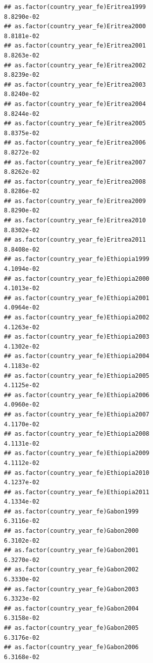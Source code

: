 \documentclass[
  a4paper,
]{article}
\begin{document}
\begin{verbatim}
## as.factor(country_year_fe)Eritrea1999                           8.8290e-02
## as.factor(country_year_fe)Eritrea2000                           8.8181e-02
## as.factor(country_year_fe)Eritrea2001                           8.8263e-02
## as.factor(country_year_fe)Eritrea2002                           8.8239e-02
## as.factor(country_year_fe)Eritrea2003                           8.8240e-02
## as.factor(country_year_fe)Eritrea2004                           8.8244e-02
## as.factor(country_year_fe)Eritrea2005                           8.8375e-02
## as.factor(country_year_fe)Eritrea2006                           8.8272e-02
## as.factor(country_year_fe)Eritrea2007                           8.8262e-02
## as.factor(country_year_fe)Eritrea2008                           8.8286e-02
## as.factor(country_year_fe)Eritrea2009                           8.8290e-02
## as.factor(country_year_fe)Eritrea2010                           8.8302e-02
## as.factor(country_year_fe)Eritrea2011                           8.8408e-02
## as.factor(country_year_fe)Ethiopia1999                          4.1094e-02
## as.factor(country_year_fe)Ethiopia2000                          4.1013e-02
## as.factor(country_year_fe)Ethiopia2001                          4.0964e-02
## as.factor(country_year_fe)Ethiopia2002                          4.1263e-02
## as.factor(country_year_fe)Ethiopia2003                          4.1302e-02
## as.factor(country_year_fe)Ethiopia2004                          4.1183e-02
## as.factor(country_year_fe)Ethiopia2005                          4.1125e-02
## as.factor(country_year_fe)Ethiopia2006                          4.0960e-02
## as.factor(country_year_fe)Ethiopia2007                          4.1170e-02
## as.factor(country_year_fe)Ethiopia2008                          4.1131e-02
## as.factor(country_year_fe)Ethiopia2009                          4.1112e-02
## as.factor(country_year_fe)Ethiopia2010                          4.1237e-02
## as.factor(country_year_fe)Ethiopia2011                          4.1334e-02
## as.factor(country_year_fe)Gabon1999                             6.3116e-02
## as.factor(country_year_fe)Gabon2000                             6.3102e-02
## as.factor(country_year_fe)Gabon2001                             6.3270e-02
## as.factor(country_year_fe)Gabon2002                             6.3330e-02
## as.factor(country_year_fe)Gabon2003                             6.3323e-02
## as.factor(country_year_fe)Gabon2004                             6.3158e-02
## as.factor(country_year_fe)Gabon2005                             6.3176e-02
## as.factor(country_year_fe)Gabon2006                             6.3168e-02

\end{verbatim}
\end{document}
